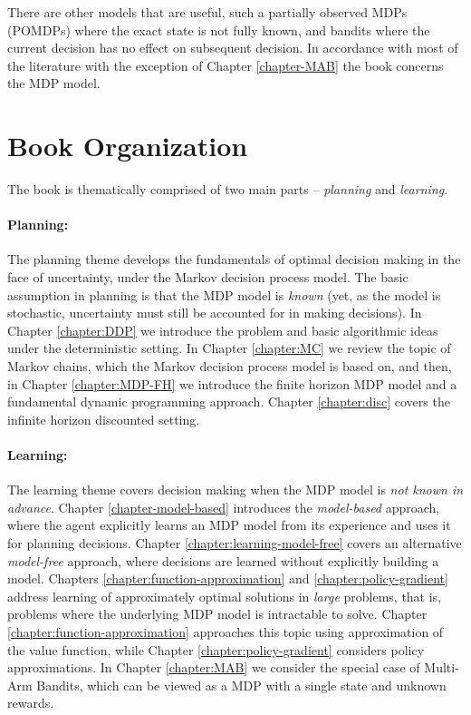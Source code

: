 There are other models that are useful, such a partially observed MDPs (POMDPs) where the exact state is not fully known, and bandits where the current decision has no effect on subsequent decision. In accordance with most of the literature with the exception of Chapter \ref{chapter-MAB} the book concerns the MDP model.


\section{Book Organization}

The book is thematically comprised of two main parts -- \textit{planning} and \textit{learning}. 

\paragraph{Planning:} The planning theme develops the fundamentals of optimal decision making in the face of uncertainty, under the Markov decision process model. The basic assumption in planning is that the MDP model is \textit{known} (yet, as the model is stochastic, uncertainty must still be accounted for in making decisions).
In Chapter \ref{chapter:DDP} we introduce the problem and basic algorithmic ideas under the deterministic setting. In Chapter \ref{chapter:MC} we review the topic of Markov chains, which the Markov decision process model is based on, and
then, in Chapter \ref{chapter:MDP-FH} we introduce the finite horizon MDP model and a fundamental dynamic programming approach. Chapter \ref{chapter:disc} covers the infinite horizon discounted setting.

\paragraph{Learning:} The learning theme covers decision making when the MDP model is \textit{not known in advance}. Chapter \ref{chapter-model-based} introduces the \textit{model-based} approach, where the agent explicitly learns an MDP model from its experience and uses it for planning decisions. Chapter \ref{chapter:learning-model-free} covers an alternative \textit{model-free} approach, where decisions are learned without explicitly building a model. Chapters \ref{chapter:function-approximation} and \ref{chapter:policy-gradient} address learning of approximately optimal solutions in \textit{large} problems, that is, problems where the underlying MDP model is intractable to solve. Chapter \ref{chapter:function-approximation} approaches this topic using approximation of the value function, while Chapter \ref{chapter:policy-gradient} considers policy approximations. In Chapter \ref{chapter:MAB} we consider the special case of Multi-Arm Bandits, which can be viewed as a MDP with a single state and unknown rewards. 

